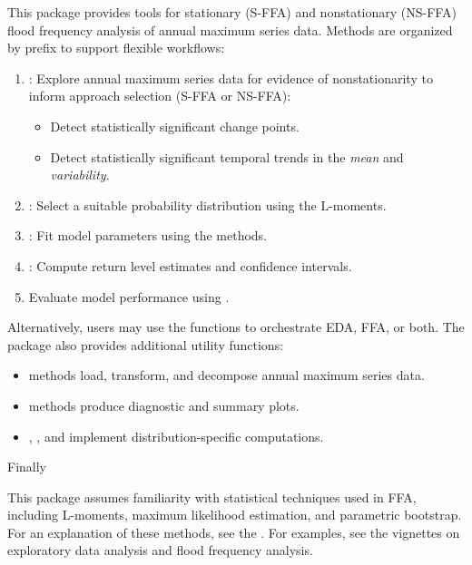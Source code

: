 \documentclass[a4paper]{book}
\begin{document}
%
\begin{Description}
This package provides tools for stationary (S-FFA) and nonstationary (NS-FFA)
flood frequency analysis of annual maximum series data. Methods are organized
by prefix to support flexible workflows:
\begin{enumerate}

\item{} : Explore annual maximum series data for evidence of nonstationarity to
inform approach selection (S-FFA or NS-FFA):
\begin{itemize}

\item{} Detect statistically significant change points.
\item{} Detect statistically significant temporal trends in the \emph{mean} and \emph{variability}.

\end{itemize}

\item{} : Select a suitable probability distribution using the L-moments.
\item{} : Fit model parameters using the  methods.
\item{} : Compute return level estimates and confidence intervals.
\item{} Evaluate model performance using .

\end{enumerate}


Alternatively, users may use the  functions to orchestrate EDA,
FFA, or both. The package also provides additional utility functions:
\begin{itemize}

\item{}  methods load, transform, and decompose annual maximum series data.
\item{}  methods produce diagnostic and summary plots.
\item{} , , and  implement distribution-specific computations.

\end{itemize}


Finally

This package assumes familiarity with statistical techniques used in FFA, including
L-moments, maximum likelihood estimation, and parametric bootstrap.
For an explanation of these methods, see the
.
For examples, see the vignettes on exploratory data analysis and flood frequency
analysis.
\end{Description}
\end{document}
